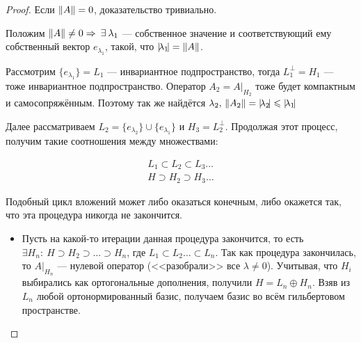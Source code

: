 \documentclass[12pt]{article}
\begin{document}
	\begin{proof}
		Если $\left\| A \right\| = 0$, доказательство тривиально.
		
		Положим $\norm{A} \neq 0 \Rightarrow \exists \lambda_1$ --- собственное значение и соответствующий ему 
		собственный вектор $e_{\lambda_1}$, такой, что $|\! \lambda_1 \!| = \left\| A \right\|$.
		
		Рассмотрим $\{e_{\lambda_1}\} = L_1$ --- инвариантное подпространство, тогда $L_1^{\perp} = H_1$ --- тоже инвариантное 
		подпространство. Оператор $A_2 = A|_{H_2}$ тоже будет компактным и самосопряжённым. Поэтому так же найдётся
		$\lambda_2,\, \left\| A_2 \right\| = |\! \lambda_2 \!| \leqslant |\! \lambda_1 \!|$
		
		Далее рассматриваем $L_2 = \{e_{\lambda_2}\} \cup \{e_{\lambda_1}\}$ и $H_3 = L_2^{\perp}$. Продолжая этот 
		процесс, получим такие соотношения между множествами:
		
		\begin{gather*}
			L_1 \subset L_2 \subset L_3 \dots \\
			H \supset H_2 \supset H_3 \dots
		\end{gather*}
		
		Подобный цикл вложений может либо оказаться конечным, либо окажется так, что эта процедура никогда не закончится.

		\begin{itemize}
		\item Пусть на какой-то итерации данная процедура закончится, то есть $\exists H_n:\: H \supset H_2 \supset \dots \supset H_n$,
			где $L_1 \subset L_2 \dots \subset L_n$. Так как процедура закончилась, то $A|_{H_n}$ --- нулевой оператор (<<разобрали>>
			все $\lambda \neq 0$). Учитывая, что $H_i$ выбирались как ортогональные дополнения, получили $H = L_n \oplus H_n$. 
			Взяв из $L_n$ любой ортонормированный базис, получаем базис во всём гильбертовом пространстве.
		

\end{itemize}
\end{proof}
\end{document}
